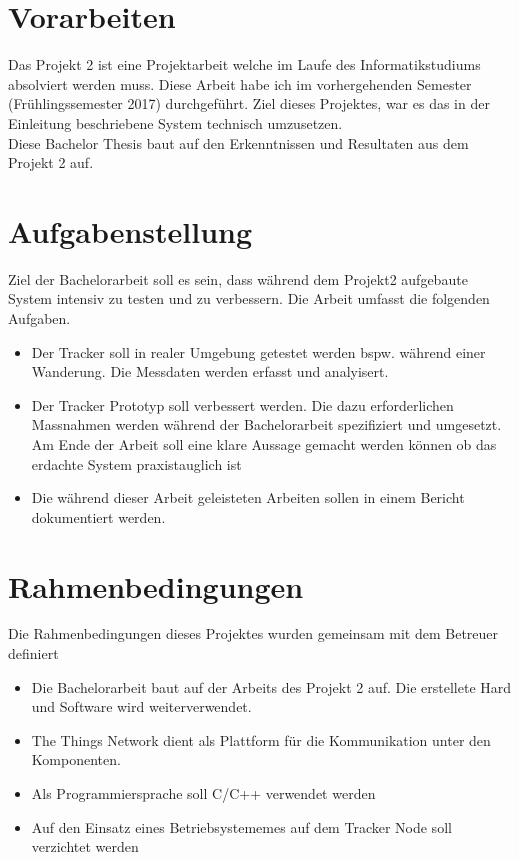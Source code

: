 \documentclass[11pt,english,german]{report}
\theoremstyle{definition}
\begin{document}
\section{Vorarbeiten}
Das Projekt 2 ist eine Projektarbeit welche im Laufe des Informatikstudiums absolviert werden muss. Diese Arbeit habe ich im vorhergehenden Semester (Frühlingssemester 2017) durchgeführt. Ziel dieses Projektes, war es das in der Einleitung beschriebene System technisch umzusetzen.\\[0.3cm]
Diese Bachelor Thesis baut auf den Erkenntnissen und Resultaten aus dem Projekt 2 auf.

\section{Aufgabenstellung}
Ziel der Bachelorarbeit soll es sein, dass während dem Projekt2 aufgebaute System intensiv zu testen und zu verbessern. Die Arbeit umfasst die folgenden Aufgaben.
\begin{itemize}
\item
Der Tracker soll in realer Umgebung getestet werden bspw. während einer Wanderung. Die Messdaten werden erfasst und analyisert.
\item Der Tracker Prototyp soll verbessert werden. Die dazu erforderlichen Massnahmen werden während der Bachelorarbeit spezifiziert und umgesetzt. Am Ende der Arbeit soll eine klare Aussage gemacht werden können ob das erdachte System praxistauglich ist
\item
Die während dieser Arbeit geleisteten Arbeiten sollen in einem Bericht dokumentiert werden.
\end{itemize}

\section{Rahmenbedingungen}
Die Rahmenbedingungen dieses Projektes wurden gemeinsam mit dem Betreuer definiert
\begin{itemize}
\item Die Bachelorarbeit baut auf der Arbeits des Projekt 2 auf. Die erstellete Hard und Software wird weiterverwendet.
\item The Things Network dient als Plattform für die Kommunikation unter den Komponenten.
\item Als Programmiersprache soll C/C++ verwendet werden
\item Auf den Einsatz eines Betriebsystememes auf dem Tracker Node soll verzichtet werden
\end{itemize}
\end{document}
